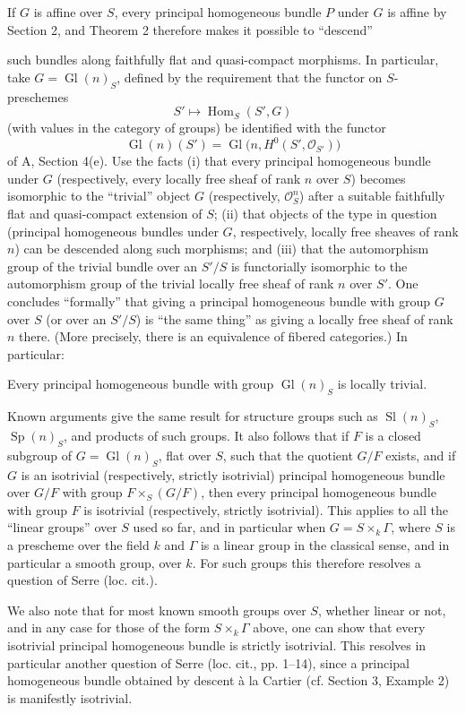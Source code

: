 If $G$ is affine over $S$, every principal homogeneous bundle $P$ under $G$ is
affine by Section 2, and Theorem 2 therefore makes it possible to “descend”

such bundles along faithfully flat and quasi-compact morphisms. In particular,
take $G=\operatorname{Gl}(n)_S$, defined by the requirement that the functor on
$S$-preschemes
\[
  S'\longmapsto\operatorname{Hom}_S(S',G)
\]
(with values in the category of groups) be identified with the functor
\[
  \operatorname{Gl}(n)(S')
  =\operatorname{Gl}\bigl(n,H^0(S',\mathcal O_{S'})\bigr)
\]
of A, Section 4(e). Use the facts (i) that every principal homogeneous bundle
under $G$ (respectively, every locally free sheaf of rank $n$ over $S$) becomes
isomorphic to the “trivial” object $G$ (respectively, $\mathcal O_S^n$) after a
suitable faithfully flat and quasi-compact extension of $S$; (ii) that objects
of the type in question (principal homogeneous bundles under $G$,
respectively, locally free sheaves of rank $n$) can be descended along such
morphisms; and (iii) that the automorphism group of the trivial bundle over an
$S'/S$ is functorially isomorphic to the automorphism group of the trivial
locally free sheaf of rank $n$ over $S'$. One concludes “formally” that giving
a principal homogeneous bundle with group $G$ over $S$ (or over an $S'/S$) is
“the same thing” as giving a locally free sheaf of rank $n$ there. (More
precisely, there is an equivalence of fibered categories.) In particular:

 Every principal homogeneous bundle with group
$\operatorname{Gl}(n)_S$ is locally trivial.

Known arguments give the same result for structure groups such as
$\operatorname{Sl}(n)_S$, $\operatorname{Sp}(n)_S$, and products of such
groups. It also follows that if $F$ is a closed subgroup of
$G=\operatorname{Gl}(n)_S$, flat over $S$, such that the quotient $G/F$ exists,
and if $G$ is an isotrivial (respectively, strictly isotrivial) principal
homogeneous bundle over $G/F$ with group $F\times_S(G/F)$, then every principal
homogeneous bundle with group $F$ is isotrivial (respectively, strictly
isotrivial). This applies to all the “linear groups” over $S$ used so far, and
in particular when $G=S\times_k\Gamma$, where $S$ is a prescheme over the field
$k$ and $\Gamma$ is a linear group in the classical sense, and in particular
a smooth group, over $k$. For such groups this therefore resolves a question
of Serre (loc. cit.).

We also note that for most known smooth groups over $S$, whether linear or not,
and in any case for those of the form $S\times_k\Gamma$ above, one can show
that every isotrivial principal homogeneous bundle is strictly isotrivial.
This resolves in particular another question of Serre (loc. cit., pp. 1--14),
since a principal homogeneous bundle obtained by descent à la Cartier (cf.
Section 3, Example 2) is manifestly isotrivial.

